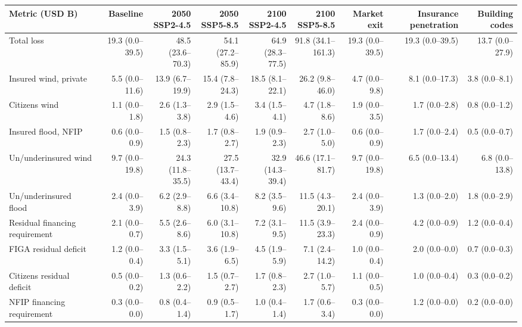 \begin{tabular}{lrrrrrrrr}
\toprule
Metric (USD B) & Baseline & 2050 SSP2-4.5 & 2050 SSP5-8.5 & 2100 SSP2-4.5 & 2100 SSP5-8.5 & Market exit & Insurance penetration & Building codes \\
\midrule
Total loss & 19.3 (0.0--39.5) & 48.5 (23.6--70.3) & 54.1 (27.2--85.9) & 64.9 (28.3--77.5) & 91.8 (34.1--161.3) & 19.3 (0.0--39.5) & 19.3 (0.0--39.5) & 13.7 (0.0--27.9) \\
Insured wind, private & 5.5 (0.0--11.6) & 13.9 (6.7--19.9) & 15.4 (7.8--24.3) & 18.5 (8.1--22.1) & 26.2 (9.8--46.0) & 4.7 (0.0--9.8) & 8.1 (0.0--17.3) & 3.8 (0.0--8.1) \\
Citizens wind & 1.1 (0.0--1.8) & 2.6 (1.3--3.8) & 2.9 (1.5--4.6) & 3.4 (1.5--4.1) & 4.7 (1.8--8.6) & 1.9 (0.0--3.5) & 1.7 (0.0--2.8) & 0.8 (0.0--1.2) \\
Insured flood, NFIP & 0.6 (0.0--0.9) & 1.5 (0.8--2.3) & 1.7 (0.8--2.7) & 1.9 (0.9--2.3) & 2.7 (1.0--5.0) & 0.6 (0.0--0.9) & 1.7 (0.0--2.4) & 0.5 (0.0--0.7) \\
Un/underinsured wind & 9.7 (0.0--19.8) & 24.3 (11.8--35.5) & 27.5 (13.7--43.4) & 32.9 (14.3--39.4) & 46.6 (17.1--81.7) & 9.7 (0.0--19.8) & 6.5 (0.0--13.4) & 6.8 (0.0--13.8) \\
Un/underinsured flood & 2.4 (0.0--3.9) & 6.2 (2.9--8.8) & 6.6 (3.4--10.8) & 8.2 (3.5--9.6) & 11.5 (4.3--20.1) & 2.4 (0.0--3.9) & 1.3 (0.0--2.0) & 1.8 (0.0--2.9) \\
\midrule
Residual financing requirement & 2.1 (0.0--0.7) & 5.5 (2.6--8.6) & 6.0 (3.1--10.8) & 7.2 (3.1--9.5) & 11.5 (3.9--23.3) & 2.4 (0.0--0.9) & 4.2 (0.0--0.9) & 1.2 (0.0--0.4) \\
FIGA residual deficit & 1.2 (0.0--0.4) & 3.3 (1.5--5.1) & 3.6 (1.9--6.5) & 4.5 (1.9--5.9) & 7.1 (2.4--14.2) & 1.0 (0.0--0.4) & 2.0 (0.0--0.0) & 0.7 (0.0--0.3) \\
Citizens residual deficit & 0.5 (0.0--0.2) & 1.3 (0.6--2.2) & 1.5 (0.7--2.7) & 1.7 (0.8--2.3) & 2.7 (1.0--5.7) & 1.1 (0.0--0.5) & 1.0 (0.0--0.4) & 0.3 (0.0--0.2) \\
NFIP financing requirement & 0.3 (0.0--0.0) & 0.8 (0.4--1.4) & 0.9 (0.5--1.7) & 1.0 (0.4--1.4) & 1.7 (0.6--3.4) & 0.3 (0.0--0.0) & 1.2 (0.0--0.0) & 0.2 (0.0--0.0) \\
\bottomrule
\end{tabular}
